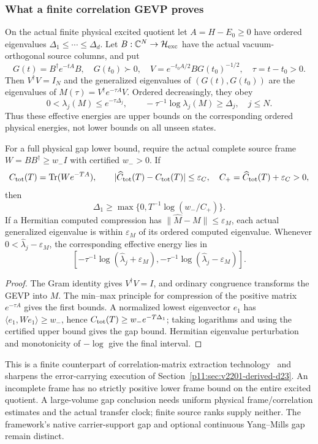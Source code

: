\documentclass[12pt,a4paper]{article}
\begin{document}
\subsubsection{What a finite correlation GEVP proves}
\begin{theorem}
\label{p11:thm:v2210-lit-gevp-frame-gap}
On the actual finite physical excited quotient let
$A=H-E_0\ge0$ have ordered eigenvalues
$\Delta_1\le\cdots\le\Delta_d$. Let $B:\mathbb C^N\to\mathcal H_{\rm exc}$
have the actual vacuum-orthogonal source columns, and put
\[
 G(t)=B^\dagger e^{-tA}B,
 \quad G(t_0)\succ0,\quad
 V=e^{-t_0A/2}BG(t_0)^{-1/2},\quad \tau=t-t_0>0.
\]
Then $V^\dagger V=I_N$ and the generalized eigenvalues of
$(G(t),G(t_0))$ are the eigenvalues of
$M(\tau)=V^\dagger e^{-\tau A}V$. Ordered decreasingly, they obey
\[
 \boxed{0<\lambda_j(M)\le e^{-\tau\Delta_j},\qquad
 -\tau^{-1}\log\lambda_j(M)\ge\Delta_j,\quad j\le N.}
\]
Thus these effective energies are upper bounds on the corresponding ordered
physical energies, not lower bounds on all unseen states.

For a full physical gap lower bound, require the actual complete source frame
$W=BB^\dagger\ge w_-I$ with certified $w_->0$. If
\[
 C_{\rm tot}(T)=\operatorname{Tr}(We^{-TA}),\qquad
 |\widehat C_{\rm tot}(T)-C_{\rm tot}(T)|\le\varepsilon_C,
 \quad C_+=\widehat C_{\rm tot}(T)+\varepsilon_C>0,
\]
then
\[
 \boxed{\Delta_1\ge
 \max\{0,T^{-1}\log(w_-/C_+)\}.}
\]
If a Hermitian computed compression has
$\|\widehat M-M\|\le\varepsilon_M$, each actual generalized eigenvalue is
within $\varepsilon_M$ of its ordered computed eigenvalue. Whenever
$0<\widehat\lambda_j-\varepsilon_M$, the corresponding effective energy
lies in
\[
 \left[-\tau^{-1}\log(\widehat\lambda_j+\varepsilon_M),
       -\tau^{-1}\log(\widehat\lambda_j-\varepsilon_M)\right].
\]
\end{theorem}
\begin{proof}
The Gram identity gives $V^\dagger V=I$, and ordinary congruence transforms
the GEVP into $M$. The min--max principle for compression of the positive
matrix $e^{-\tau A}$ gives the first bounds. A normalized lowest eigenvector
$e_1$ has $\langle e_1,We_1\rangle\ge w_-$, hence
$C_{\rm tot}(T)\ge w_-e^{-T\Delta_1}$; taking logarithms and using the
certified upper bound gives the gap bound. Hermitian eigenvalue perturbation
and monotonicity of $-\log$ give the final interval.
\end{proof}
This is a finite counterpart of correlation-matrix extraction
technology~\cite{LitQCDBlossier2009GEVP} and sharpens the error-carrying
execution of Section~\ref{p11:sec:v2201-derived-d23}. An incomplete frame
has no strictly positive lower frame bound on the entire excited quotient.
A large-volume gap conclusion needs uniform physical frame/correlation
estimates and the actual transfer clock; finite source ranks supply neither.
The framework's native carrier-support gap and optional continuous
Yang--Mills gap remain distinct.
\end{document}
